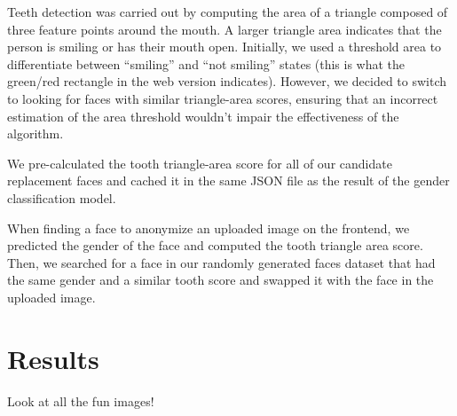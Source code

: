 Teeth detection was carried out by computing the area of a triangle composed of three feature points around the mouth. A larger triangle area indicates that the person is smiling or has their mouth open. Initially, we used a threshold area to differentiate between ``smiling'' and ``not smiling'' states (this is what the green/red rectangle in the web version indicates). However, we decided to switch to looking for faces with similar triangle-area scores, ensuring that an incorrect estimation of the area threshold wouldn't impair the effectiveness of the algorithm.

We pre-calculated the tooth triangle-area score for all of our candidate replacement faces and cached it in the same JSON file as the result of the gender classification model.

When finding a face to anonymize an uploaded image on the frontend, we predicted the gender of the face and computed the tooth triangle area score. Then, we searched for a face in our randomly generated faces dataset that had the same gender and a similar tooth score and swapped it with the face in the uploaded image.

\section{Results}

Look at all the fun images!




